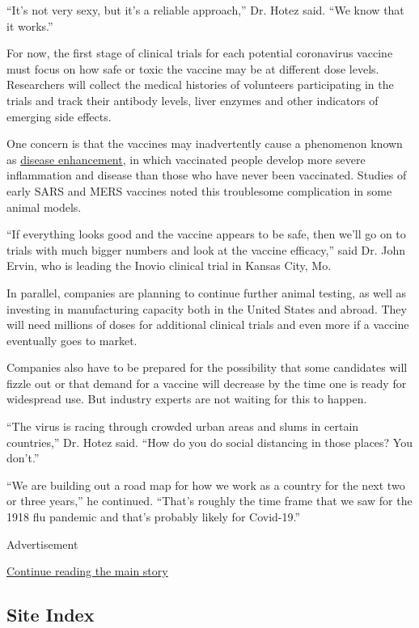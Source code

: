 ``It's not very sexy, but it's a reliable approach,'' Dr. Hotez said.
``We know that it works.''

For now, the first stage of clinical trials for each potential
coronavirus vaccine must focus on how safe or toxic the vaccine may be
at different dose levels. Researchers will collect the medical histories
of volunteers participating in the trials and track their antibody
levels, liver enzymes and other indicators of emerging side effects.

One concern is that the vaccines may inadvertently cause a phenomenon
known as
\href{https://www.ncbi.nlm.nih.gov/pmc/articles/PMC6290032/}{disease
enhancement}, in which vaccinated people develop more severe
inflammation and disease than those who have never been vaccinated.
Studies of early SARS and MERS vaccines noted this troublesome
complication in some animal models.

``If everything looks good and the vaccine appears to be safe, then
we'll go on to trials with much bigger numbers and look at the vaccine
efficacy,'' said Dr. John Ervin, who is leading the Inovio clinical
trial in Kansas City, Mo.

In parallel, companies are planning to continue further animal testing,
as well as investing in manufacturing capacity both in the United States
and abroad. They will need millions of doses for additional clinical
trials and even more if a vaccine eventually goes to market.

Companies also have to be prepared for the possibility that some
candidates will fizzle out or that demand for a vaccine will decrease by
the time one is ready for widespread use. But industry experts are not
waiting for this to happen.

``The virus is racing through crowded urban areas and slums in certain
countries,'' Dr. Hotez said. ``How do you do social distancing in those
places? You don't.''

``We are building out a road map for how we work as a country for the
next two or three years,'' he continued. ``That's roughly the time frame
that we saw for the 1918 flu pandemic and that's probably likely for
Covid-19.''

Advertisement

\protect\hyperlink{after-bottom}{Continue reading the main story}

\hypertarget{site-index}{%
\subsection{Site Index}\label{site-index}}

